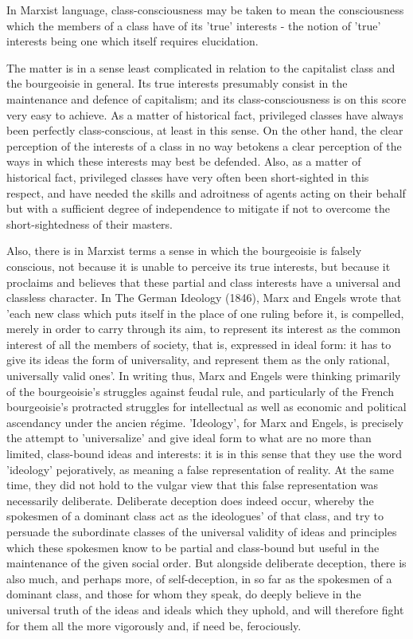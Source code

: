 In Marxist language, class-consciousness may be taken to mean the consciousness which the members of a class have of its 'true' interests - the notion of 'true' interests being one which itself requires elucidation.

The matter is in a sense least complicated in relation to the capitalist class and the bourgeoisie in general. Its true interests presumably consist in the maintenance and defence of capitalism; and its class-consciousness is on this score very easy to achieve. As a matter of historical fact, privileged classes have always been perfectly class-conscious, at least in this sense. On the other hand, the clear perception of the interests of a class in no way betokens a clear perception of the ways in which these interests may best be defended. Also, as a matter of historical fact, privileged classes have very often been short-sighted in this respect, and have needed the skills and adroitness of agents acting on their behalf but with a sufficient degree of independence to mitigate if not to overcome the short-sightedness of their masters.

Also, there is in Marxist terms a sense in which the bourgeoisie is falsely conscious, not because it is unable to perceive its true interests, but because it proclaims and believes that these partial and class interests have a universal and classless character. In The German Ideology (1846), Marx and Engels wrote that 'each new class which puts itself in the place of one ruling before it, is compelled, merely in order to carry through its aim, to represent its interest as the common interest of all the members of society, that is, expressed in ideal form: it has to give its ideas the form of universality, and represent them as the only rational, universally valid ones'. In writing thus, Marx and Engels were thinking primarily of the bourgeoisie's struggles against feudal rule, and particularly of the French bourgeoisie's protracted struggles for intellectual as well as economic and political ascendancy under the ancien régime. 'Ideology', for Marx and Engels, is precisely the attempt to 'universalize' and give ideal form to what are no more than limited, class-bound ideas and interests: it is in this sense that they use the word 'ideology' pejoratively, as meaning a false representation of reality. At the same time, they did not hold to the vulgar view that this false representation was necessarily deliberate. Deliberate deception does indeed occur, whereby the spokesmen of a dominant class act as the ideologues' of that class, and try to persuade the subordinate classes of the universal validity of ideas and principles which these spokesmen know to be partial and class-bound but useful in the maintenance of the given social order. But alongside deliberate deception, there is also much, and perhaps more, of self-deception, in so far as the spokesmen of a dominant class, and those for whom they speak, do deeply believe in the universal truth of the ideas and ideals which they uphold, and will therefore fight for them all the more vigorously and, if need be, ferociously.

